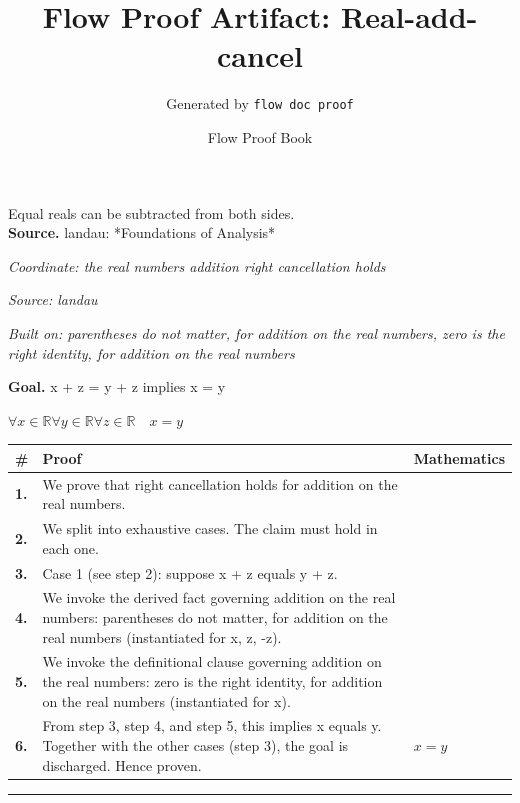 \documentclass[11pt]{article}
\title{Flow Proof Artifact: Real-add-cancel}
\author{Generated by \texttt{flow doc proof}}
\date{Flow Proof Book}
\theoremstyle{definition}
\begin{document}
\maketitle
Equal reals can be subtracted from both sides.\\[0.5em]
\textbf{Source.} landau: *Foundations of Analysis*\\[0.5em]
\bigskip
{}\par
\smallskip\noindent\textit{Coordinate: the real numbers \cdot addition \cdot right cancellation holds}\par
\smallskip\noindent\textit{Source: landau}\par
\smallskip\noindent\textit{Built on: parentheses do not matter, for addition on the real numbers, zero is the right identity, for addition on the real numbers}\par
\medskip
\noindent\textbf{Goal.} x + z = y + z implies x = y\par
\noindent$\displaystyle \forall x \in \mathbb{R} \forall y \in \mathbb{R} \forall z \in \mathbb{R}\quad x = y$\par
\medskip
\noindent
\begin{tabular}{@{} >{\raggedright\arraybackslash}p{} >{\raggedright\arraybackslash}p{} >{\raggedleft\arraybackslash}p{} @{}}
\textbf{\#} & \textbf{Proof} & \textbf{Mathematics} \\
\midrule
\textbf{1.} & We prove that right cancellation holds for addition on the real numbers. & \\[0.45em]
\textbf{2.} & We split into exhaustive cases. The claim must hold in each one. & \\[0.45em]
\textbf{3.} & Case 1 (see step 2): suppose x + z  equals  y + z. & \\[0.45em]
\textbf{4.} & We invoke the derived fact governing addition on the real numbers: parentheses do not matter, for addition on the real numbers (instantiated for x, z, -z). & \\[0.45em]
\textbf{5.} & We invoke the definitional clause governing addition on the real numbers: zero is the right identity, for addition on the real numbers (instantiated for x). & \\[0.45em]
\textbf{6.} & From step 3, step 4, and step 5, this implies x equals y. Together with the other cases (step 3), the goal is discharged. Hence proven. & $\displaystyle x = y$ \\[0.45em]
\bottomrule
\end{tabular}
\label{thm:Real-addition-right_cancellation_holds}
\par\medskip\hrule
\end{document}
